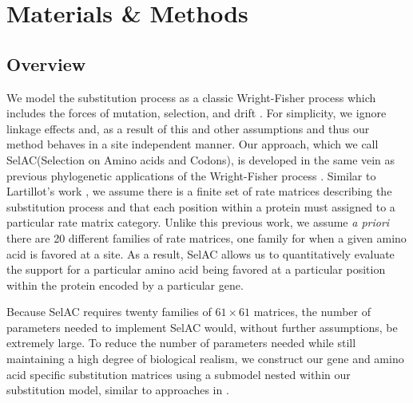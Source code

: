 \documentclass{article}
\newcommand{\selac}{SelAC\xspace}
\begin{document}
\section*{Materials \& Methods}

\subsection*{Overview}

We model the substitution process as a classic Wright-Fisher process which includes the forces of mutation, selection, and drift \citep{Fisher1930,Kimura1962,Wright1969,Iwasa1988,BergAndLassig2003,SellaAndHirsh2005,McCandlishAndStoltzfus2014}.
For simplicity, we ignore linkage effects and, as a result of this and other assumptions and thus our method behaves in a site independent manner.
Our approach, which we call \selac (Selection on Amino acids and Codons), is developed in the same vein as previous phylogenetic applications of the Wright-Fisher process \citep[e.g.][]{MuseAndGaut1994,HalpernAndBruno1998,YangAndNielsen2008,RodrigueEtAl2005,KoshiAndGoldstein1997,KoshiEtAl1999,DimmicEtAl2000,ThorneEtAl2012,LartillotAndPhilippe2004,RodrigueAndLartillot2014}.
Similar to Lartillot's work \citep{LartillotAndPhilippe2004,RodrigueAndLartillot2014}, we assume there is a finite set of rate matrices describing the substitution process and that each position within a protein must assigned to a particular rate matrix category.
Unlike this previous work, we assume \emph{a priori} there are 20 different families of rate matrices, one family for when a given amino acid is favored at a site.
As a result, \selac allows us to quantitatively evaluate the support for a particular amino acid being favored at a particular position within the protein encoded by a particular gene.

Because \selac requires twenty families of $61 \times 61$ matrices, the number of parameters needed to implement \selac would, without further assumptions, be extremely large.
To reduce the number of parameters needed while still maintaining a high degree of biological realism, we construct our gene and amino acid specific substitution matrices using a submodel nested within our substitution model, similar to approaches in \citep[e.g.][]{Gilchrist2007,ShahAndGilchrist2011,GilchristEtAl2015}.
\end{document}
